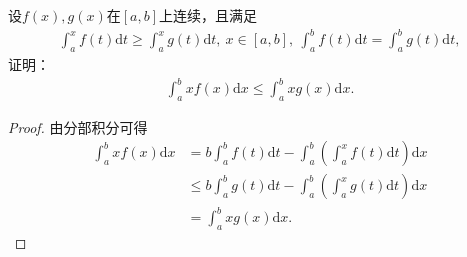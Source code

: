 \documentclass[../../main.tex]{subfiles}
\begin{document}
\begin{example}
设$f(x),g(x)$在$[a,b]$上连续，且满足
\begin{align*}
\int_a^x f(t)\mathrm{d}t \geq \int_a^x g(t)\mathrm{d}t, \ x\in[a,b], \ \int_a^b f(t)\mathrm{d}t = \int_a^b g(t)\mathrm{d}t,
\end{align*}
证明：
\begin{align*}
\int_a^b xf(x)\mathrm{d}x \leq \int_a^b xg(x)\mathrm{d}x.
\end{align*}
\end{example}
\begin{proof}
由分部积分可得
\begin{align*}
\int_a^b{xf\left( x \right) \mathrm{d}x}&=b\int_a^b{f\left( t \right) \mathrm{d}t}-\int_a^b{\left( \int_a^x{f\left( t \right) \mathrm{d}t} \right) \mathrm{d}x}
\\
&\leqslant b\int_a^b{g\left( t \right) \mathrm{d}t}-\int_a^b{\left( \int_a^x{g\left( t \right) \mathrm{d}t} \right) \mathrm{d}x}
\\
&=\int_a^b{xg\left( x \right) \mathrm{d}x}.
\end{align*}

\end{proof}
\end{document}
